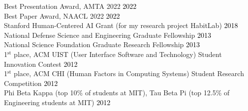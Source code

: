 {}

Best Presentation Award, AMTA 2022 \hfill \textcolor{black}{2022}\\ %
Best Paper Award, NAACL 2022 \hfill \textcolor{black}{2022}\\ %
Stanford Human-Centered AI Grant (for my research project HabitLab) \hfill \textcolor{black}{2018}\\ %
National Defense Science and Engineering Graduate Fellowship \hfill \textcolor{black}{2013}\\ %
National Science Foundation Graduate Research Fellowship \hfill \textcolor{black}{2013}\\ %
1$^{\textrm{st}}$ place, ACM UIST (User Interface Software and Technology) Student Innovation Contest \hfill \textcolor{black}{2012}\\
1$^{\textrm{st}}$ place, ACM CHI (Human Factors in Computing Systems) Student Research Competition \hfill \textcolor{black}{2012}\\
Phi Beta Kappa (top 10\% of students at MIT), Tau Beta Pi (top 12.5\% of Engineering students at MIT) \hfill \textcolor{black}{2012}\\
